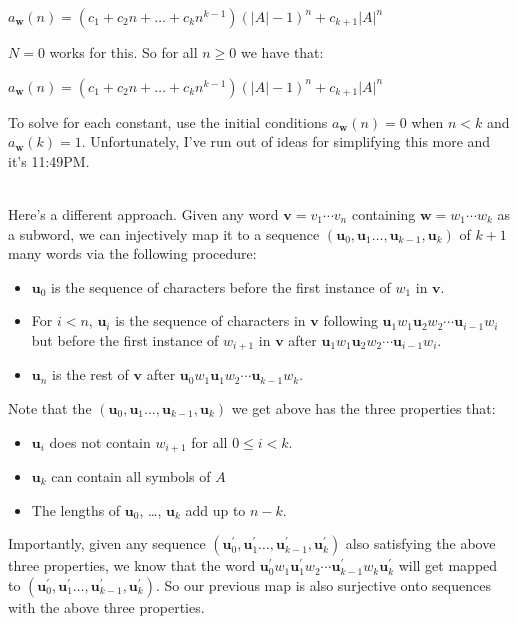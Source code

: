 \documentclass{book}
\newenvironment{myIndent}{%
   \begin{adjustwidth}{2.5em}{0em}%
}{%
   \end{adjustwidth}%
}
\newcommand{\mySepTwo}[1][.]{%
   {\noindent\color{#1}{\rule{6.5in}{0.5mm}}}\\%
}
\newcommand{\retTwo}{\hfill\bigbreak}
\begin{document}
\begin{myIndent}
   {\centering $a_{\bm{w}}(n) = (c_1 + c_2n + \ldots + c_k n^{k-1})(|A| - 1)^n + c_{k+1}|A|^n$ \retTwo\par}

   $N = 0$ works for this. So for all $n \geq 0$ we have that:
   
   {\centering $a_{\bm{w}}(n) = (c_1 + c_2n + \ldots + c_k n^{k-1})(|A| - 1)^n + c_{k+1}|A|^n$\retTwo\par}
   
   To solve for each constant, use the initial conditions $a_{\bm{w}}(n) = 0$ when $n < k$ and $a_{\bm{w}}(k) = 1$. Unfortunately, I've run out of ideas for simplifying this more and it's 11:49PM.\retTwo

   \mySepTwo

   Here's a different approach. Given any word $\bm{v} = v_1\cdots v_n$ containing $\bm{w} = w_1\cdots w_k$ as a subword, we can injectively map it to a sequence $(\bm{u}_0, \bm{u}_1 \ldots, \bm{u}_{k-1}, \bm{u}_k)$ of $k+1$ many words via the following procedure:

   \begin{itemize}
      \item $\bm{u}_0$ is the sequence of characters before the first instance of $w_1$ in $\bm{v}$.
      \item For $i < n$, $\bm{u}_i$ is the sequence of characters in $\bm{v}$ following $\bm{u}_1w_1\bm{u}_2w_2\cdots\bm{u}_{i-1}w_i$ but before the first instance of $w_{i + 1}$ in $\bm{v}$ after $\bm{u}_1w_1\bm{u}_2w_2\cdots\bm{u}_{i-1}w_i$.
      \item $\bm{u}_n$ is the rest of $\bm{v}$ after $\bm{u}_0w_1\bm{u}_1w_2\cdots\bm{u}_{k-1}w_k$.\retTwo
   \end{itemize}

   Note that the $(\bm{u}_0, \bm{u}_1 \ldots, \bm{u}_{k-1}, \bm{u}_k)$ we get above has the three properties that:
   
   \begin{itemize}
      \item $\bm{u}_i$ does not contain $w_{i + 1}$ for all $0 \leq i < k$.
      \item $\bm{u}_k$ can contain all symbols of $A$
      \item The lengths of $\bm{u}_0$, \dots, $\bm{u}_k$ add up to $n - k$.\retTwo
   \end{itemize}

   Importantly, given any sequence $(\bm{u}^\prime_0, \bm{u}^\prime_1 \ldots, \bm{u}^\prime_{k-1}, \bm{u}^\prime_k)$ also satisfying the above three properties, we know that the word $\bm{u}^\prime_0w_1\bm{u}^\prime_1w_2\cdots\bm{u}^\prime_{k-1}w_k\bm{u}^\prime_k$ will get mapped to $(\bm{u}^\prime_0, \bm{u}^\prime_1 \ldots, \bm{u}^\prime_{k-1}, \bm{u}^\prime_k)$. So our previous map is also surjective onto sequences with the above three properties.\retTwo


\end{myIndent}
\end{document}
